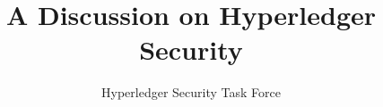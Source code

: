 \documentclass{llncs}
\begin{document}
	
	\title{A Discussion on Hyperledger Security}
	
	\author{%
	Hyperledger Security Task Force
	}
	\institute{}

		
	\maketitle
	\thispagestyle{empty} %

	\begin{abstract}
		
	\end{abstract}


	

	
	
	

	
	
	
\end{document}
